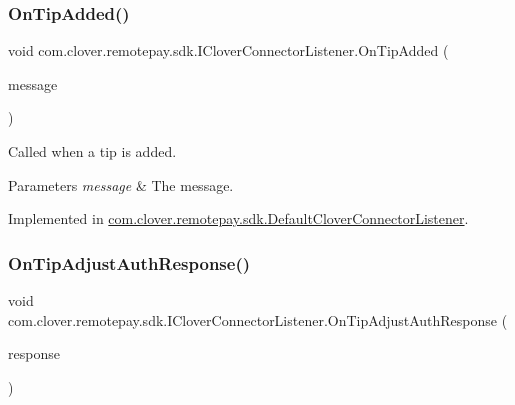 \subsubsection{\texorpdfstring{On\+Tip\+Added()}{OnTipAdded()}}
{\footnotesize\ttfamily void com.\+clover.\+remotepay.\+sdk.\+I\+Clover\+Connector\+Listener.\+On\+Tip\+Added (\begin{DoxyParamCaption}\item[{Tip\+Added\+Message}]{message }\end{DoxyParamCaption})}



Called when a tip is added. 


\begin{DoxyParams}{Parameters}
{\em message} & The message.\\
\hline
\end{DoxyParams}


Implemented in \hyperlink{classcom_1_1clover_1_1remotepay_1_1sdk_1_1_default_clover_connector_listener_a8d3f850e69a03e0ef259f992a4865b52}{com.\+clover.\+remotepay.\+sdk.\+Default\+Clover\+Connector\+Listener}.

\mbox{\label{interfacecom_1_1clover_1_1remotepay_1_1sdk_1_1_i_clover_connector_listener_af972cda237b66fcd297117ae195537b7}} 
\subsubsection{\texorpdfstring{On\+Tip\+Adjust\+Auth\+Response()}{OnTipAdjustAuthResponse()}}
{\footnotesize\ttfamily void com.\+clover.\+remotepay.\+sdk.\+I\+Clover\+Connector\+Listener.\+On\+Tip\+Adjust\+Auth\+Response (\begin{DoxyParamCaption}\item[{\hyperlink{classcom_1_1clover_1_1remotepay_1_1sdk_1_1_tip_adjust_auth_response}{Tip\+Adjust\+Auth\+Response}}]{response }\end{DoxyParamCaption})}



